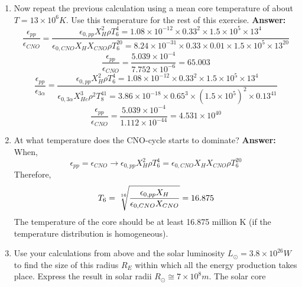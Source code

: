 \documentclass[11pt]{scrartcl}
\begin{document}
{\begin{enumerate}[label=(\alph*)]
\item Now repeat the previous calculation using a mean core temperature of about $T = 13 \times 10^6 K$. Use this temperature for the rest of this exercise.
\newline \textbf{Answer: }
\begin{equation}
    \frac{\epsilon_{pp}}{\epsilon_{CNO}} = \frac{\epsilon_{0,pp}X^2_H\rho T^4_6 = 1.08 \times 10^{-12} \times 0.33^2 \times 1.5 \times 10^5 \times 13^4} {\epsilon_{0,CNO}X_HX_{CNO}\rho T^{20}_6 = 8.24 \times 10^{-31} \times 0.33 \times 0.01 \times 1.5 \times 10^5 \times 13^{20}}
\end{equation}
\begin{equation}
    \frac{\epsilon_{pp}}{\epsilon_{CNO}} = \frac{5.039 \times 10^{-4}}{7.752 \times 10^{-6}}= 65.003
\end{equation}
\begin{equation}
    \frac{\epsilon_{pp}}{\epsilon_{3\alpha}} = \frac{\epsilon_{0,pp}X^2_H\rho T^4_6 = 1.08 \times 10^{-12} \times 0.33^2 \times 1.5 \times 10^5 \times 13^4} {\epsilon_{0,3\alpha}X^3_{He}\rho^2 T^{41}_8 = 3.86 \times 10^{-18} \times 0.65^3 \times (1.5 \times 10^5)^2 \times 0.13^{41}}
\end{equation}
\begin{equation}
    \frac{\epsilon_{pp}}{\epsilon_{CNO}} = \frac{5.039 \times 10^{-4}}{1.112 \times 10^{-44}}= 4.531 \times 10^{40}
\end{equation}
\item At what temperature does the CNO-cycle starts to dominate?
\newline \textbf{Answer: }
\newline When, 
\begin{equation}
    \epsilon_{pp} = \epsilon_{CNO}\rightarrow \epsilon_{0,pp}X^2_H\rho T^4_6 = \epsilon_{0,CNO}X_HX_{CNO}\rho T^{20}_6 
\end{equation}
Therefore,
\begin{equation}
    T_6 = \sqrt[\leftroot{-2}\uproot{2}16]{\frac{\epsilon_{0,pp}X_H}{\epsilon_{0,CNO}X_{CNO}}} = 16.875
\end{equation}
The temperature of the core should be at least 16.875 million K (if the temperature distribution is homogeneous).
\item Use
your calculations from above and the solar luminosity $L_\odot= 3.8 \times 10^{26} W$ to find the size of this radius $R_E$ within
which all the energy production takes place. Express the result in solar radii $R_\odot \cong 7 \times 10^8 m$. The solar core

\end{enumerate}}
\end{document}
